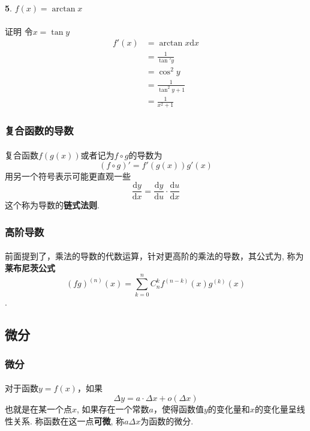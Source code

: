 \paragraph{}
\textbf{5}. $f(x) = \arctan{x}$

\paragraph{}
证明\:  令$x = \tan{y}$
\begin{align*}
f'(x) & = \arctan{x} \mathrm{d} x  \\
& = \frac{1}{\tan'{y}} \\
& = \cos^2{y} \\
& = \frac{1}{\tan^2{y} + 1} \\
& = \frac{1}{x^2 + 1}
\end{align*}



\subsubsection{复合函数的导数}
\paragraph{}
复合函数$f(g(x))$或者记为$f \circ g$的导数为
$$
(f \circ g)' = f'(g(x)) g'(x)
$$
用另一个符号表示可能更直观一些
$$
\frac{\mathrm{d} y}{\mathrm{d} x} = \frac{\mathrm{d} y}{\mathrm{d} u} \cdot  \frac{\mathrm{d} u}{\mathrm{d} x}
$$
这个称为导数的\textbf{链式法则}.


\subsubsection{高阶导数}
\paragraph{}
前面提到了，乘法的导数的代数运算，针对更高阶的乘法的导数，其公式为, 称为\textbf{莱布尼茨公式}
$$
(fg)^{(n)}(x) = \sum_{k = 0}^n C_n^k f^{(n -k)}(x) g^{(k)}(x)
$$
.


\subsection{微分}

\subsubsection{微分}
\paragraph{}
对于函数$y = f(x)$，如果
$$
\Delta y = a \cdot \Delta x + o(\Delta x)
$$
也就是在某一个点$x$, 如果存在一个常数$a$，使得函数值$y$的变化量和$x$的变化量呈线性关系. 称函数在这一点\textbf{可微}, 称$a \Delta x$为函数的微分.

